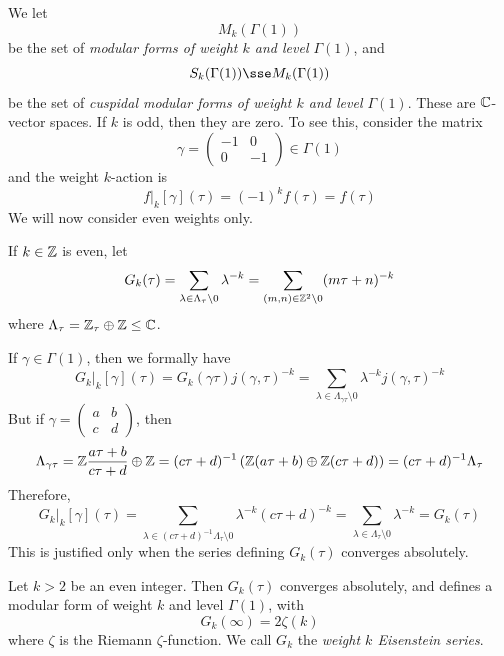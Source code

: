 \documentclass{article}
\begin{document}
\begin{remark}
    We let
    \[M_k(\Gamma(1))\]
    be the set of \emph{modular forms of weight \(k\) and level \(\Gamma(1)\)}, and
    \[S_k(\Gamma(1)) \sse M_k(\Gamma(1))\]
    be the set of \emph{cuspidal modular forms of weight \(k\) and level \(\Gamma(1)\)}. These are \(\mathbb{C}\)-vector spaces. If \(k\) is odd, then they are zero. To see this, consider the matrix
    \[\gamma = \begin{pmatrix}
        -1 & 0 \\ 0 & -1
    \end{pmatrix} \in \Gamma(1)\]
    and the weight \(k\)-action is
    \[f\vert_k[\gamma](\tau) = (-1)^kf(\tau) = f(\tau)\]
    We will now consider even weights only.
\end{remark}

If \(k \in \mathbb{Z}\) is even, let
\[G_k(\tau) = \sum_{\lambda \in \Lambda_\tau \setminus 0}\lambda^{-k} = \sum_{(m, n) \in \mathbb{Z}^2 \setminus 0} (m \tau + n)^{-k}\]
where \(\Lambda_\tau = \mathbb{Z}_\tau \oplus \mathbb{Z} \le \mathbb{C}\).

If \(\gamma \in \Gamma(1)\), then we formally have
\[G_k\vert_k[\gamma](\tau) = G_k(\gamma\tau)j(\gamma, \tau)^{-k} = \sum_{\lambda \in \Lambda_{\gamma\tau}\setminus 0}\lambda^{-k}j(\gamma, \tau)^{-k}\]
But if \(\gamma = \begin{pmatrix}
    a & b \\ c & d
\end{pmatrix}\), then
\[\Lambda_{\gamma\tau} = \mathbb{Z}\frac{a\tau + b}{c\tau + d} \oplus \mathbb{Z} = (c\tau + d)^{-1}\left(\mathbb{Z}(a \tau + b) \oplus \mathbb{Z}(c \tau + d)\right) = (c\tau + d)^{-1}\Lambda_\tau\]
Therefore,
\[G_k\vert_k[\gamma](\tau) = \sum_{\lambda \in (c\tau + d)^{-1}\Lambda_\tau \setminus 0}\lambda^{-k}(c\tau + d)^{-k} = \sum_{\lambda \in \Lambda_\tau \setminus 0}\lambda^{-k} = G_k(\tau)\]
This is justified only when the series defining \(G_k(\tau)\) converges absolutely.

\begin{proposition}
    Let \(k > 2\) be an even integer. Then \(G_k(\tau)\) converges absolutely, and defines a modular form of weight \(k\) and level \(\Gamma(1)\), with
    \[G_k(\infty) = 2\zeta(k)\]
    where \(\zeta\) is the Riemann \(\zeta\)-function. We call \(G_k\) the \emph{weight \(k\) Eisenstein series}.
\end{proposition}
\end{document}
